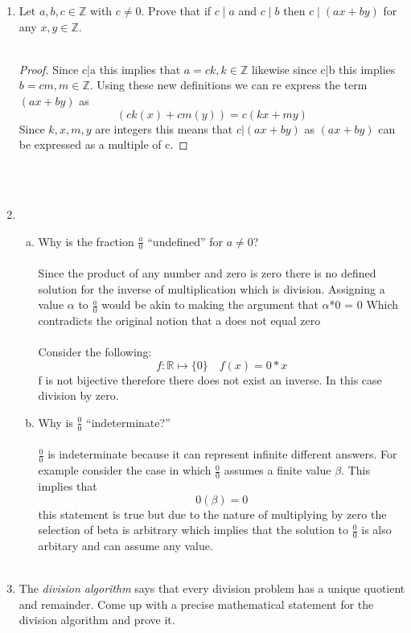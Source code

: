 \documentclass[11pt]{article}
\def\Z{\mathbb{Z}}
\begin{document}
\begin{enumerate}
\item Let $a, b, c \in \Z$ with $c \ne 0$.
Prove that if $c \mid a$ and $c \mid b$ then $c \mid (ax+by)$ for any $x, y \in \Z$.\\\\
\begin{proof}
  Since c|a this implies that $a=ck,k \in \mathbb{Z}$ likewise since c|b this implies $b=cm, m\in \mathbb{Z}$. Using these new definitions we can re express the term $(ax+by)$ as \[
    (ck(x)+cm(y))=c(kx+my)
  \]
  Since $k,x,m,y$ are integers this means that $c|(ax+by)$ as $(ax+by)$ can be expressed as a multiple of c.
\end{proof}
\\\\
\item
\begin{enumerate}[(a)]
  \item Why is the fraction $\frac{a}{0}$ ``undefined'' for $a \ne 0$?\\\\
  Since the product of any number and zero is zero there is no defined solution for the inverse of multiplication which is division. Assigning a value $\alpha$ to $\frac{a}{0}$ would be akin to making the argument that $\alpha$*0 = 0 Which contradicts the original notion that a does not equal zero\\\\ Consider the following:
\[
  f:\mathbb{R} \mapsto \{0\}\quad f(x)=0*x
\]
f is not bijective therefore there does not exist an inverse. In this case division by zero.


  \item Why is $\frac{0}{0}$ ``indeterminate?''
  \\\\
  $\frac{0}{0}$ is indeterminate because it can represent infinite different answers. For example consider the case in which   $\frac{0}{0}$ assumes a finite value $\beta$. This implies that \[
    0(\beta)=0
  \]
  this statement is true but due to the nature of multiplying by zero the selection of beta is arbitrary which implies that the solution to $\frac{0}{0}$ is also arbitary and can assume any value.
  \\\\
\end{enumerate}

\item The \emph{division algorithm} says that every division problem has a unique quotient and remainder.
Come up with a precise mathematical statement for the division algorithm and prove it.


\end{enumerate}
\end{document}
